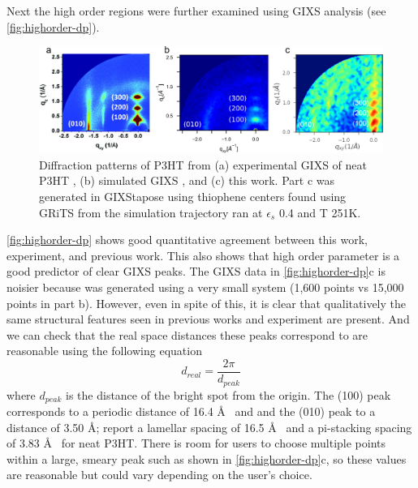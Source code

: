 Next the high order regions were further examined using GIXS analysis (see \autoref{fig:highorder-dp}).
\begin{figure}
    \centering
    \includegraphics[width=0.8\linewidth]{figures/p3ht_val/Miller2018_fig6comparison.png}
    \caption[Diffraction patterns of P3HT from (a) experimental GIXS of neat P3HT, (b) simulated GIXS, and (c) this work. Part c was generated in GIXStapose using thiophene centers found using GRiTS from the simulation trajectory ran at $\epsilon_{s}$ 0.4 and T 251K.]{Diffraction patterns of P3HT from (a) experimental GIXS of neat P3HT \cite{Ko2012}, (b) simulated GIXS \citep{Miller2018}, and (c) this work. Part c was generated in GIXStapose using thiophene centers found using GRiTS from the simulation trajectory ran at $\epsilon_{s}$ 0.4 and T 251K.}\label{fig:highorder-dp}
\end{figure}
\autoref{fig:highorder-dp} shows good quantitative agreement between this work, experiment, and previous work. This also shows that high order parameter is a good predictor of clear GIXS peaks.
The GIXS data in \autoref{fig:highorder-dp}c is noisier because was generated using a very small system (1,600 points vs 15,000 points in part b). However, even in spite of this, it is clear that qualitatively the same structural features seen in previous works and experiment are present. 
And we can check that the real space distances these peaks correspond to are reasonable using the following equation
\begin{equation}\label{eq:peaks_to_dspace}
    d_{real} = \frac{2 \pi}{d_{peak}}
\end{equation}
where $d_{peak}$ is the distance of the bright spot from the origin.
The (100) peak corresponds to a periodic distance of 16.4 \AA~ and and the (010) peak to a distance of 3.50 \AA; \citet{Duong2013} report a lamellar spacing of 16.5 \AA~ and a pi-stacking spacing of 3.83 \AA~ for neat P3HT. 
There is room for users to choose multiple points within a large, smeary peak such as shown in \autoref{fig:highorder-dp}c, so these values are reasonable but could vary depending on the user's choice.

